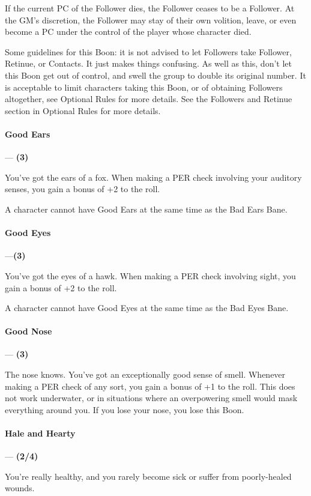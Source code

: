 \documentclass[oneside,11pt,english]{book}
\begin{document}
If the current PC of the Follower dies, the Follower ceases to be a Follower. At the GM's discretion, the 
Follower may stay of their own volition, leave, or even become a PC under the control of the player 
whose character died. 

 

Some guidelines for this Boon: it is not advised to let Followers take Follower, Retinue, or Contacts. It 
just makes things confusing. As well as this, don't let this Boon get out of control, and swell the group to 
double its original number. It is acceptable to limit characters taking this Boon, or of obtaining Followers 
altogether, see Optional Rules for more details. See the Followers and Retinue section in Optional 
Rules for more details. 

 

\paragraph{\label{boon:Good Ears}Good Ears}---\quad\textbf{ (3) }\par
You've got the ears of a fox. When making a PER check involving your auditory senses, you gain a bonus 
of +2 to the roll. 


A character cannot have Good Ears at the same time as the Bad Ears Bane. 


\paragraph{\label{boon:Good Eyes}Good Eyes}---\quad\textbf{(3) }\par
You've got the eyes of a hawk. When making a PER check involving sight, you gain a bonus of +2 to the roll. 


A character cannot have Good Eyes at the same time as the Bad Eyes Bane. 


\paragraph{\label{boon:Good Nose}Good Nose}---\quad\textbf{ (3) }\par
The nose knows. You've got an exceptionally good sense of smell. Whenever making a PER check of any 
sort, you gain a bonus of +1 to the roll. This does not work underwater, or in situations where an 
overpowering smell would mask everything around you. If you lose your nose, you lose this Boon. 

 

\paragraph{\label{boon:Hale and Hearty}Hale and Hearty}---\quad\textbf{ (2/4) }\par
You're really healthy, and you rarely become sick or suffer from poorly-healed wounds. 
\end{document}
